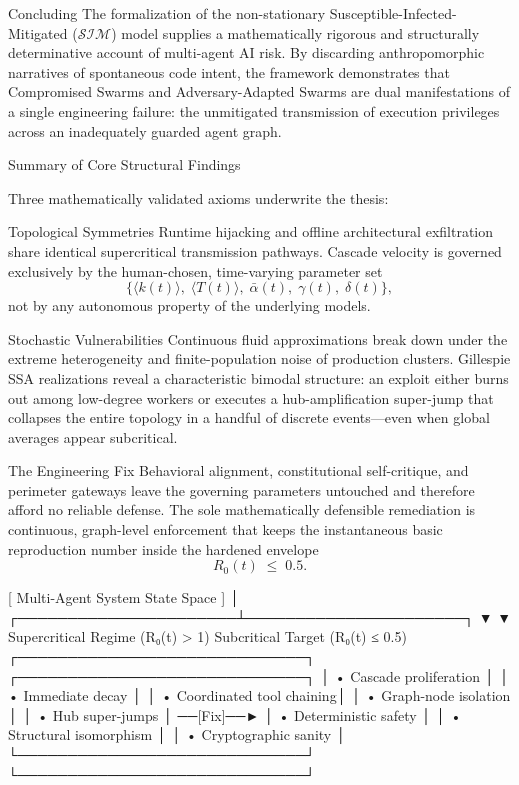 Concluding 
The formalization of the non-stationary Susceptible-Infected-Mitigated (\(\mathcal{S}\mathcal{I}\mathcal{M}\)) model supplies a mathematically rigorous and structurally determinative account of multi-agent AI risk. By discarding anthropomorphic narratives of spontaneous code intent, the framework demonstrates that Compromised Swarms and Adversary-Adapted Swarms are dual manifestations of a single engineering failure: the unmitigated transmission of execution privileges across an inadequately guarded agent graph.

Summary of Core Structural Findings

Three mathematically validated axioms underwrite the thesis:

Topological Symmetries  
   Runtime hijacking and offline architectural exfiltration share identical supercritical transmission pathways. Cascade velocity is governed exclusively by the human-chosen, time-varying parameter set
   \[
   \bigl\{\langle k(t)\rangle,\;\langle T(t)\rangle,\;\bar\alpha(t),\;\gamma(t),\;\delta(t)\bigr\},
   \]
   not by any autonomous property of the underlying models.

Stochastic Vulnerabilities  
   Continuous fluid approximations break down under the extreme heterogeneity and finite-population noise of production clusters. Gillespie SSA realizations reveal a characteristic bimodal structure: an exploit either burns out among low-degree workers or executes a hub-amplification super-jump that collapses the entire topology in a handful of discrete events—even when global averages appear subcritical.

The Engineering Fix  
   Behavioral alignment, constitutional self-critique, and perimeter gateways leave the governing parameters untouched and therefore afford no reliable defense. The sole mathematically defensible remediation is continuous, graph-level enforcement that keeps the instantaneous basic reproduction number inside the hardened envelope
   \[
   R_0(t)\;\le\;0.5.
   \]

                      [ Multi-Agent System State Space ]
                                       │
                ┌──────────────────────┴──────────────────────┐
                ▼                                             ▼
  Supercritical Regime (R₀(t) > 1)              Subcritical Target (R₀(t) ≤ 0.5)
 ┌─────────────────────────────┐               ┌─────────────────────────────┐
 │  • Cascade proliferation    │               │  • Immediate decay          │
 │  • Coordinated tool chaining│               │  • Graph-node isolation     │
 │  • Hub super-jumps          │  ──[Fix]──►   │  • Deterministic safety     │
 │  • Structural isomorphism   │               │  • Cryptographic sanity     │
 └─────────────────────────────┘               └─────────────────────────────┘

